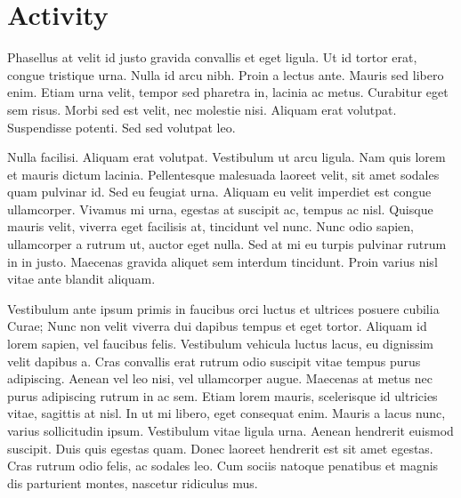 \section{Activity}

Phasellus at velit id justo gravida convallis et eget ligula. Ut id tortor erat, congue tristique urna. Nulla id arcu nibh. Proin a lectus ante. Mauris sed libero enim. Etiam urna velit, tempor sed pharetra in, lacinia ac metus. Curabitur eget sem risus. Morbi sed est velit, nec molestie nisi. Aliquam erat volutpat. Suspendisse potenti. Sed sed volutpat leo.

Nulla facilisi. Aliquam erat volutpat. Vestibulum ut arcu ligula. Nam quis lorem et mauris dictum lacinia. Pellentesque malesuada laoreet velit, sit amet sodales quam pulvinar id. Sed eu feugiat urna. Aliquam eu velit imperdiet est congue ullamcorper. Vivamus mi urna, egestas at suscipit ac, tempus ac nisl. Quisque mauris velit, viverra eget facilisis at, tincidunt vel nunc. Nunc odio sapien, ullamcorper a rutrum ut, auctor eget nulla. Sed at mi eu turpis pulvinar rutrum in in justo. Maecenas gravida aliquet sem interdum tincidunt. Proin varius nisl vitae ante blandit aliquam.

Vestibulum ante ipsum primis in faucibus orci luctus et ultrices posuere cubilia Curae; Nunc non velit viverra dui dapibus tempus et eget tortor. Aliquam id lorem sapien, vel faucibus felis. Vestibulum vehicula luctus lacus, eu dignissim velit dapibus a. Cras convallis erat rutrum odio suscipit vitae tempus purus adipiscing. Aenean vel leo nisi, vel ullamcorper augue. Maecenas at metus nec purus adipiscing rutrum in ac sem. Etiam lorem mauris, scelerisque id ultricies vitae, sagittis at nisl. In ut mi libero, eget consequat enim. Mauris a lacus nunc, varius sollicitudin ipsum. Vestibulum vitae ligula urna. Aenean hendrerit euismod suscipit. Duis quis egestas quam. Donec laoreet hendrerit est sit amet egestas. Cras rutrum odio felis, ac sodales leo. Cum sociis natoque penatibus et magnis dis parturient montes, nascetur ridiculus mus. 
